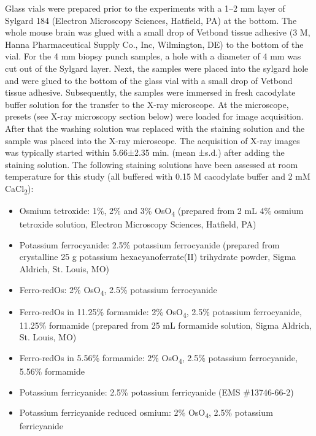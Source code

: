\documentclass{article}
\begin{document}
Glass vials were prepared prior to the experiments with a 1–2 mm layer of Sylgard 184 (Electron Microscopy Sciences, Hatfield, PA) at the bottom. The whole mouse brain was glued with a small drop of Vetbond tissue adhesive (3 M, Hanna Pharmaceutical Supply Co., Inc, Wilmington, DE) to the bottom of the vial. For the 4 mm biopsy punch samples, a hole with a diameter of 4 mm was cut out of the Sylgard layer. Next, the samples were placed into the sylgard hole and were glued to the bottom of the glass vial with a small drop of Vetbond tissue adhesive. Subsequently, the samples were immersed in fresh cacodylate buffer solution for the transfer to the X-ray microscope. At the microscope, presets (see X-ray microscopy section below) were loaded for image acquisition. After that the washing solution was replaced with the staining solution and the sample was placed into the X-ray microscope. The acquisition of X-ray images was typically started within 5.66±2.35 min. (mean ±s.d.) after adding the staining solution. The following staining solutions have been assessed at room temperature for this study (all buffered with 0.15 M cacodylate buffer and 2 mM CaCl\textsubscript{2}):
\begin{itemize}
\item Osmium tetroxide: 1\%, 2\% and 3\% OsO\textsubscript{4} (prepared from 2 mL 4\% osmium tetroxide solution, Electron Microscopy Sciences, Hatfield, PA)
\item Potassium ferrocyanide: 2.5\% potassium ferrocyanide (prepared from crystalline 25 g potassium hexacyanoferrate(II) trihydrate powder, Sigma Aldrich, St. Louis, MO)
\item Ferro-redOs: 2\% OsO\textsubscript{4}, 2.5\% potassium ferrocyanide
\item Ferro-redOs in 11.25\% formamide: 2\% OsO\textsubscript{4}, 2.5\% potassium ferrocyanide, 11.25\% formamide (prepared from 25 mL formamide solution, Sigma Aldrich, St. Louis, MO)
\item Ferro-redOs in 5.56\% formamide: 2\% OsO\textsubscript{4}, 2.5\% potassium ferrocyanide, 5.56\% formamide
\item Potassium ferricyanide: 2.5\% potassium ferricyanide (EMS \#13746-66-2)
\item Potassium ferricyanide reduced osmium: 2\% OsO\textsubscript{4}, 2.5\% potassium ferricyanide
\end{itemize}
\end{document}
